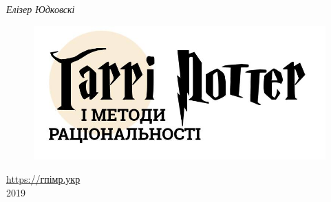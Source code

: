 \begin{titlepage}

\addtolength{\voffset}{2cm}

\begin{flushleft}
  \noindent
  \hspace{9cm}
  \Huge{\textit{Елізер Юдковскі}}
\end{flushleft}

\vspace{0.5cm}

\begin{figure}
  \centering
  \includegraphics{hpimr.png}
\end{figure}

\vspace{11.0cm}

\begin{center}
    \underline{\url{https://гпімр.укр}} \\
    2019
\end{center}

\end{titlepage}

